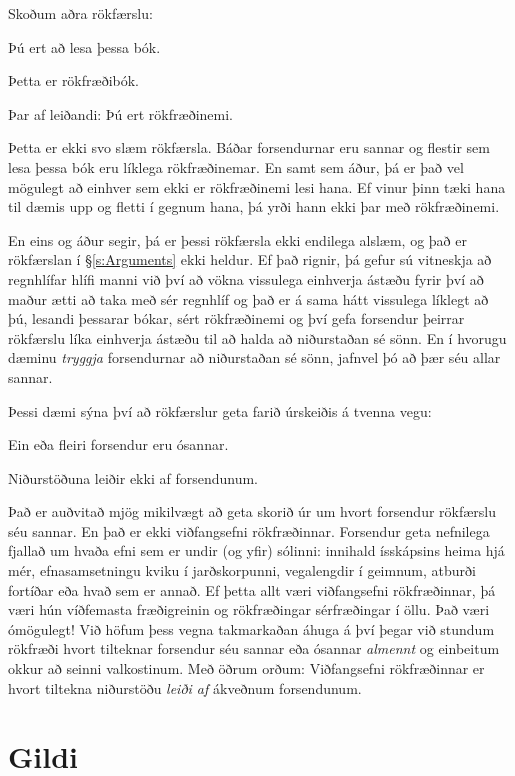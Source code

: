 Skoðum aðra rökfærslu:

	\begin{earg}
		\item[] Þú ert að lesa þessa bók.
		\item[] Þetta er rökfræðibók.
		\item[Þar af leiðandi:] Þú ert rökfræðinemi.
	\end{earg}

Þetta er ekki svo slæm rökfærsla. Báðar forsendurnar eru sannar og flestir sem lesa þessa bók eru líklega rökfræðinemar. En samt sem áður, þá er það vel mögulegt að einhver sem ekki er rökfræðinemi lesi hana. Ef vinur þinn tæki hana til dæmis upp og fletti í gegnum hana, þá yrði hann ekki þar með rökfræðinemi. 

En eins og áður segir, þá er þessi rökfærsla ekki endilega alslæm, og það er rökfærslan í \S\ref{s:Arguments} ekki heldur. Ef það rignir, þá gefur sú vitneskja að regnhlífar hlífi manni við því að vökna vissulega einhverja ástæðu fyrir því að maður ætti að taka með sér regnhlíf og það er á sama hátt vissulega líklegt að þú, lesandi þessarar bókar, sért rökfræðinemi og því gefa forsendur þeirrar rökfærslu líka einhverja ástæðu til að halda að niðurstaðan sé sönn. En í hvorugu dæminu \emph{tryggja} forsendurnar að niðurstaðan sé sönn, jafnvel þó að þær séu allar sannar.

Þessi dæmi sýna því að rökfærslur geta farið úrskeiðis á tvenna vegu:
%
	\begin{ebullet}
		\item Ein eða fleiri forsendur eru ósannar. 
		\item Niðurstöðuna leiðir ekki af forsendunum.
	\end{ebullet}
Það er auðvitað mjög mikilvægt að geta skorið úr um hvort forsendur rökfærslu séu sannar. En það er ekki viðfangsefni rökfræðinnar. Forsendur geta nefnilega fjallað um hvaða efni sem er undir (og yfir) sólinni: innihald ísskápsins heima hjá mér, efnasamsetningu kviku í jarðskorpunni, vegalengdir í geimnum, atburði fortíðar eða hvað sem er annað. Ef þetta allt væri viðfangsefni rökfræðinnar, þá væri hún víðfemasta fræðigreinin og rökfræðingar sérfræðingar í öllu. Það væri ómögulegt! Við höfum þess vegna takmarkaðan áhuga á því þegar við stundum rökfræði hvort tilteknar forsendur séu sannar eða ósannar \emph{almennt} og einbeitum okkur að seinni valkostinum. Með öðrum orðum: Viðfangsefni rökfræðinnar er hvort tiltekna niðurstöðu \emph{leiði af} ákveðnum forsendunum.

\section{Gildi}

